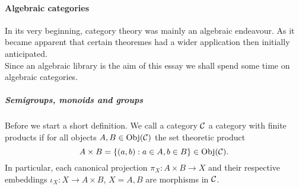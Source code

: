 \paragraph{Algebraic categories}
In its very beginning, category theory was mainly an algebraic endeavour. As it became apparent that certain theoremes had a wider application then initially anticipated.\\
Since an algebraic library is the aim of this essay we shall spend some time on algebraic categories.
\subparagraph{Semigroups, monoids and groups}
Before we start a short definition. We call a category $\mathcal{C}$ a category with finite products if for all objects $A, B \in \mathrm{Obj}({\mathcal{C}})$ the set theoretic product 
$$A \times B = \{(a,b) : a \in A, b \in B\} \in \mathrm{Obj}({\mathcal{C}}).$$
In particular, each canonical projection $\pi_X : A \times B \longrightarrow X$ and their respective embeddings $\iota_X : X \longrightarrow A \times B$, $X = A, B$ are morphisms in $\mathcal{C}$.\\
